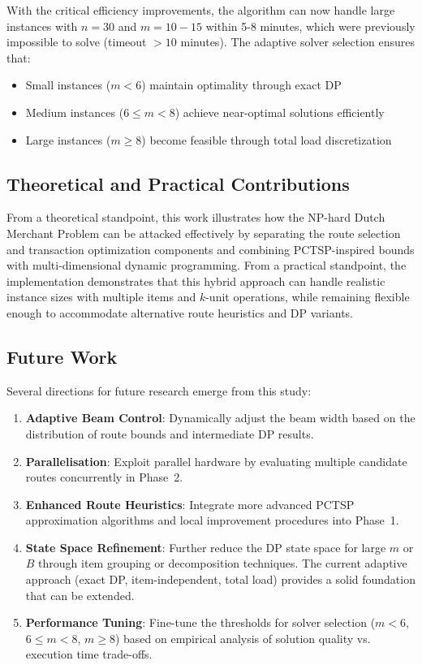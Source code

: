 \documentclass[12pt]{article}
\begin{document}
With the critical efficiency improvements, the algorithm can now handle large instances with $n=30$ and $m=10-15$ within 5-8 minutes, which were previously impossible to solve (timeout $>10$ minutes). The adaptive solver selection ensures that:
\begin{itemize}
    \item Small instances ($m < 6$) maintain optimality through exact DP
    \item Medium instances ($6 \leq m < 8$) achieve near-optimal solutions efficiently
    \item Large instances ($m \geq 8$) become feasible through total load discretization
\end{itemize}

\subsection{Theoretical and Practical Contributions}

From a theoretical standpoint, this work illustrates how the NP-hard Dutch Merchant Problem \cite{reduction2025} can be attacked effectively by separating the route selection and transaction optimization components and combining PCTSP-inspired bounds with multi-dimensional dynamic programming. From a practical standpoint, the implementation demonstrates that this hybrid approach can handle realistic instance sizes with multiple items and $k$-unit operations, while remaining flexible enough to accommodate alternative route heuristics and DP variants.

\subsection{Future Work}

Several directions for future research emerge from this study:

\begin{enumerate}
    \item \textbf{Adaptive Beam Control}: Dynamically adjust the beam width based on the distribution of route bounds and intermediate DP results.
    \item \textbf{Parallelisation}: Exploit parallel hardware by evaluating multiple candidate routes concurrently in Phase~2.
    \item \textbf{Enhanced Route Heuristics}: Integrate more advanced PCTSP approximation algorithms and local improvement procedures into Phase~1.
    \item \textbf{State Space Refinement}: Further reduce the DP state space for large $m$ or $B$ through item grouping or decomposition techniques. The current adaptive approach (exact DP, item-independent, total load) provides a solid foundation that can be extended.
    
    \item \textbf{Performance Tuning}: Fine-tune the thresholds for solver selection ($m < 6$, $6 \leq m < 8$, $m \geq 8$) based on empirical analysis of solution quality vs. execution time trade-offs.
\end{enumerate}
\end{document}
